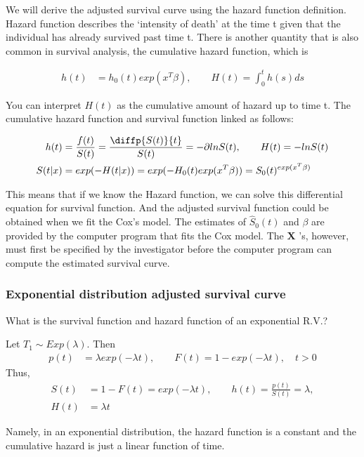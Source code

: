 \documentclass[11pt]{article} %
\begin{document}
We will derive the adjusted survival curve using the hazard function definition. Hazard function describes the `intensity of death' at the time t given that the individual has already survived past time t. There is another quantity that is also common in survival analysis, the cumulative hazard function, which is

\begin{align*}
	h(t) &= h_0(t) exp(x^T \beta), \qquad H(t) = \int_{0}^t h(s) ds
\end{align*}

You can interpret $H(t)$ as the cumulative amount of hazard up to time t. The cumulative hazard function and survival function linked as follows:

\begin{align*}
	h(t) &= \frac{f(t)}{S(t)} = \frac{\diffp{S(t)}{t}}{S(t)} =  - \partial ln S(t), \qquad    H(t) = -ln S(t)\\
	S(t|x) &= exp(-H(t|x)) = exp(-H_0(t) exp(x^T \beta)) = S_0(t)^{exp(x^T \beta)}
\end{align*}

This means that if we know the Hazard function, we can solve this differential equation for survival function. And the adjusted survival function could be obtained when we fit the Cox's model. The estimates of $\hat{S}_0(t)$ and $\beta$  are provided by the computer program that fits the Cox model. The  $\mathbf{X}$ ’s, however, must first be specified by the investigator before the computer program can compute the estimated survival curve.

\subsubsection{Exponential distribution adjusted survival curve}
What is the survival function and hazard function of an exponential R.V.? 

Let $T_1 \sim Exp(\lambda)$.
Then
\begin{align*}
	p(t) &= \lambda exp(-\lambda t), \qquad F(t) = 1- exp(-\lambda t), \quad t>0
\end{align*}
Thus,
\begin{align*}
	S(t) &= 1- F(t) =  exp(-\lambda t), \qquad h(t) = \frac{p(t)}{S(t)} = \lambda, \\
	H(t) &= \lambda t
\end{align*}

Namely, in an exponential distribution, the hazard function is a constant and the cumulative hazard is just a linear function of time. 
\end{document}
